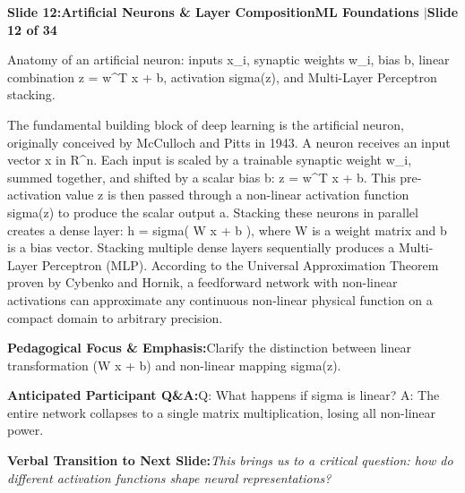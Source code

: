 \documentclass[11pt,a4paper]{article}
\begin{document}
\clearpage
\hypertarget{slide.12}{}
{}
\noindent\begin{tcolorbox}[colback=navy,colframe=navy,left=6pt,right=6pt,top=3pt,bottom=3pt,boxrule=0pt,arc=2pt]
{\large\bfseries\color{white}Slide 12:\enspace Artificial Neurons \& Layer Composition}\hfill{\footnotesize\bfseries\color{white!85!lightbg}ML Foundations \enspace$|$\enspace Slide 12 of 34}
\end{tcolorbox}
\vspace{0.2em}
\begin{tcolorbox}[colback=lightbg,colframe=bordergray,title={\footnotesize\bfseries\color{darkgray}Slide Visual Blueprint},fontupper=\small,left=6pt,right=6pt,top=2.5pt,bottom=2.5pt,boxrule=0.6pt,arc=2.5pt]
Anatomy of an artificial neuron: inputs x\_i, synaptic weights w\_i, bias b, linear combination z = w\textasciicircum{}T x + b, activation sigma(z), and Multi-Layer Perceptron stacking.
\end{tcolorbox}
\vspace{0.2em}
\begin{tcolorbox}[colback=white,colframe=primaryblue,title={\footnotesize\bfseries\color{white}Spoken Presenter Script},fontupper=\small,left=6pt,right=6pt,top=3pt,bottom=3pt,boxrule=0.8pt,arc=2.5pt]
The fundamental building block of deep learning is the artificial neuron, originally conceived by McCulloch and Pitts in 1943. A neuron receives an input vector x in R\textasciicircum{}n. Each input is scaled by a trainable synaptic weight w\_i, summed together, and shifted by a scalar bias b: z = w\textasciicircum{}T x + b. This pre-activation value z is then passed through a non-linear activation function sigma(z) to produce the scalar output a. Stacking these neurons in parallel creates a dense layer: h = sigma( W x + b ), where W is a weight matrix and b is a bias vector. Stacking multiple dense layers sequentially produces a Multi-Layer Perceptron (MLP). According to the Universal Approximation Theorem proven by Cybenko and Hornik, a feedforward network with non-linear activations can approximate any continuous non-linear physical function on a compact domain to arbitrary precision.
\end{tcolorbox}
\vspace{0.2em}
\begin{tcolorbox}[colback=lightbg,colframe=bordergray,left=6pt,right=6pt,top=3pt,bottom=3pt,boxrule=0.6pt,arc=2.5pt]
\small
\noindent\textbf{\color{navy}Pedagogical Focus \& Emphasis:}\enspace Clarify the distinction between linear transformation (W x + b) and non-linear mapping sigma(z).\par\vspace{0.3em}
\noindent\textbf{\color{successgreen}Anticipated Participant Q\&A:}\enspace Q: What happens if sigma is linear? A: The entire network collapses to a single matrix multiplication, losing all non-linear power.\par\vspace{0.3em}
\noindent\textbf{\color{accent}Verbal Transition to Next Slide:}\enspace \emph{This brings us to a critical question: how do different activation functions shape neural representations?}
\end{tcolorbox}
\end{document}
